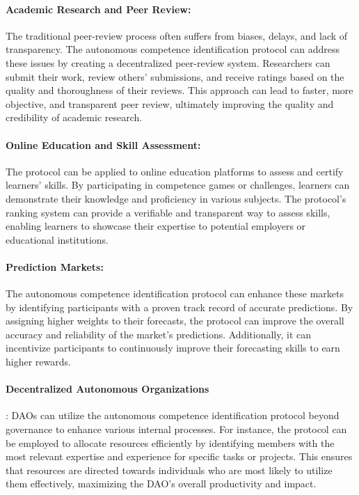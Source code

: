 \documentclass{article}
\begin{document}
\begin{CJK}{UTF8}{gbsn}
\begin{multicols}{2}
        \paragraph*{Academic Research and Peer Review:} The traditional peer-review process often suffers from biases, delays, and lack of transparency. The autonomous competence identification protocol can address these issues by creating a decentralized peer-review system. Researchers can submit their work, review others' submissions, and receive ratings based on the quality and thoroughness of their reviews. This approach can lead to faster, more objective, and transparent peer review, ultimately improving the quality and credibility of academic research.

        \paragraph*{Online Education and Skill Assessment:} The protocol can be applied to online education platforms to assess and certify learners' skills. By participating in competence games or challenges, learners can demonstrate their knowledge and proficiency in various subjects. The protocol's ranking system can provide a verifiable and transparent way to assess skills, enabling learners to showcase their expertise to potential employers or educational institutions.

        \paragraph*{Prediction Markets:} The autonomous competence identification protocol can enhance these markets by identifying participants with a proven track record of accurate predictions. By assigning higher weights to their forecasts, the protocol can improve the overall accuracy and reliability of the market's predictions. Additionally, it can incentivize participants to continuously improve their forecasting skills to earn higher rewards.

        \paragraph*{Decentralized Autonomous Organizations}: DAOs can utilize the autonomous competence identification protocol beyond governance to enhance various internal processes. For instance, the protocol can be employed to allocate resources efficiently by identifying members with the most relevant expertise and experience for specific tasks or projects. This ensures that resources are directed towards individuals who are most likely to utilize them effectively, maximizing the DAO's overall productivity and impact.


\end{multicols}
\end{CJK}
\end{document}
